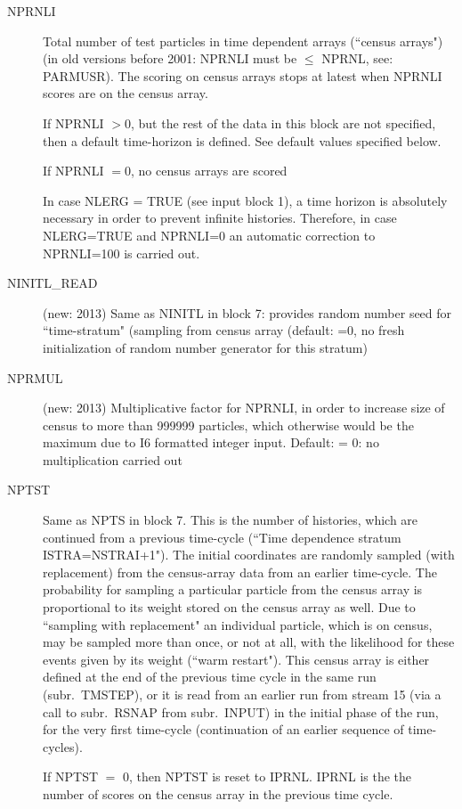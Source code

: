 \begin{description}
  \item[NPRNLI] Total number of test particles in time dependent arrays (``census arrays") (in old versions before 2001: NPRNLI must be $\le$ NPRNL, see: PARMUSR).
        The scoring on census arrays stops at latest when NPRNLI scores are on the census array.

        If NPRNLI $>0$, but the rest of the data in this block are not specified, then a default time-horizon is defined.
        See default values specified below.

        If NPRNLI $=0$, no census arrays are scored 

        In case NLERG = TRUE  (see input block 1), a time horizon is absolutely necessary in order to prevent infinite histories.
        Therefore, in case NLERG=TRUE and NPRNLI=0 an automatic correction to NPRNLI=100 is carried out.
  \item[NINITL\_READ]  (new: 2013) Same as NINITL in block 7: provides random number seed for ``time-stratum" (sampling from census array  (default: =0, no fresh initialization of random number generator for this stratum)
  \item[NPRMUL] (new: 2013) Multiplicative factor for NPRNLI, in order to increase size of census to more than 999999 particles, which otherwise would be the maximum due to I6 formatted integer input.
        Default: = 0: no multiplication carried out
  \item[NPTST] Same as NPTS in block 7.
        This is the number of histories, which are continued from a previous time-cycle (``Time dependence stratum ISTRA=NSTRAI+1").
        The initial coordinates are randomly sampled (with replacement) from the census-array data from an earlier time-cycle.
        The probability for sampling a particular particle from the census array is proportional to its weight stored on the census array as well.
        Due to ``sampling with replacement" an individual particle, which is on census, may be sampled more than once, or not at all, with the likelihood for these events given by its weight (``warm restart").
        This census array is either defined at the end of the previous time cycle in the same run (subr.\ TMSTEP), or it is read from an earlier run from stream 15 (via a call to subr.\ RSNAP from subr.\ INPUT) in the initial phase of the run, for the very first time-cycle (continuation of an earlier sequence of time-cycles).

        If NPTST $=$ 0, then NPTST is reset to IPRNL.
        IPRNL is the the number of scores on the census array in the previous time cycle.


\end{description}
